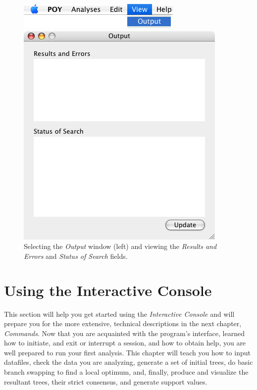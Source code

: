\begin{figure}
\centering
\begin{minipage}[c]{0.48\textwidth}
   		\includegraphics[width=\textwidth]{figures/view_menu.jpg}
\end{minipage}
\quad
\begin{minipage}[c]{0.48\textwidth}
	   	\includegraphics[width=\textwidth]{figures/output_window.jpg}
   	\end{minipage}
\caption{Selecting the \emph{Output} window (left) and viewing the \emph{Results and Errors} and  \emph{Status of Search} fields.}
\label{fig:results_and_status_windows}
\end{figure}

\section{Using the Interactive Console} \label{interactiveconsole}

This section will help you get started using the \poy \emph{Interactive Console} and will prepare you for the
more extensive, technical descriptions in the next chapter, \emph{\poy Commands}. Now that you are acquainted with the program's interface, learned how to initiate, and exit or interrupt a \poy session, and how to obtain help, you are well prepared to run your first analysis. This chapter will teach
you how to input datafiles, check the data you are analyzing, generate
a set of initial trees, do basic branch swapping to find a local optimum, and, finally, produce
and visualize the resultant trees, their strict consensus, and generate support values.

